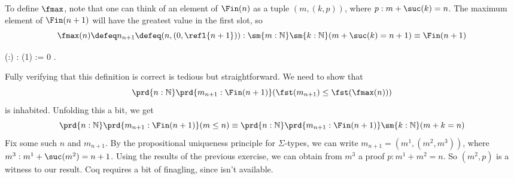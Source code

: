     To define $\fmax$, note that one can think of an element of $\Fin(n)$ as a
    tuple $(m, (k, p))$, where $p : m + \suc(k) = n$.  The maximum element of
    $\Fin(n+1)$ will have the greatest value in the first slot, so
    \[
    \fmax(n) \defeq n_{n+1} \defeq (n, (0, \refl{n+1}))
    : \sm{m:\mathbb{N}}\sm{k:\mathbb{N}} (m+\suc(k) = n+1)
    \equiv \Fin(n+1)
    \] \begin{coqdoccode}
\coqdocemptyline
\coqdocnoindent
{}  (:) : (1) := \coqdocnotation{(}\coqdocnotation{;} \coqdocnotation{(}0\coqdocnotation{;} \coqdocnotation{))}.\coqdoceol
\coqdocemptyline
\end{coqdoccode}
\noindent
    Fully verifying that this definition is correct is tedious but straightforward.  We
    need to show that
    \[
    \prd{n:\mathbb{N}}\prd{m_{n+1}:\Fin(n+1)} (\fst(m_{n+1}) \leq \fst(\fmax(n)))
    \]
    is inhabited.  Unfolding this a bit, we get
    \[
    \prd{n:\mathbb{N}}\prd{m_{n+1}:\Fin(n+1)} (m \leq n)
    \equiv
    \prd{n:\mathbb{N}}\prd{m_{n+1}:\Fin(n+1)}\sm{k:\mathbb{N}} (m + k = n)
    \]
    Fix some such $n$ and $m_{n+1}$.  By the propositional uniqueness principle for
    $\Sigma$-types, we can write $m_{n+1} = (m^{1}, (m^{2}, m^{3}))$, where $m^{3}
    : m^{1} + \suc(m^{2}) = n + 1$.  Using the results of the previous exercise, we
    can obtain from $m^{3}$ a proof $p : m^{1} + m^{2} = n$.  So $(m^{2}, p)$ is a
    witness to our result. 
    Coq requires a bit of finagling, since  isn't available.
